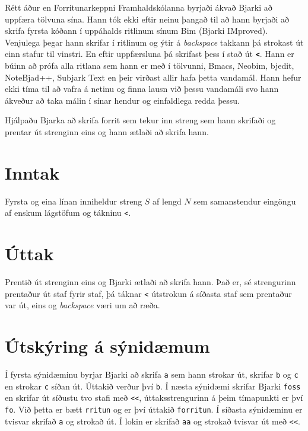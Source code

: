 

Rétt áður en Forritunarkeppni Framhaldskólanna byrjaði ákvað Bjarki að
uppfæra tölvuna sína. Hann tók ekki eftir neinu þangað til að hann byrjaði að
skrifa fyrsta kóðann í uppáhalds ritlinum sínum Bim (Bjarki IMproved). Venjulega
þegar hann skrifar í ritlinum og ýtir á \emph{backspace} takkann þá strokast út einn
stafur til vinstri. En eftir uppfærsluna þá skrifast þess í stað út \textbf{\texttt{<}}. Hann er
búinn að prófa alla ritlana sem hann er með í tölvunni, Bmacs, Neobim, bjedit,
NoteBjad++, Subjark Text en þeir virðast allir hafa þetta vandamál. Hann hefur
ekki tíma til að vafra á netinu og finna lausn við þessu vandamáli svo hann
ákveður að taka málin í sínar hendur og einfaldlega redda þessu.

Hjálpaðu Bjarka að skrifa forrit sem tekur inn streng sem hann skrifaði og
prentar út strenginn eins og hann ætlaði að skrifa hann.

\section*{Inntak}
Fyrsta og eina línan inniheldur streng $S$ af lengd $N$ sem samanstendur
eingöngu af enskum lágstöfum og tákninu \texttt{<}.

\section*{Úttak}
Prentið út strenginn eins og Bjarki ætlaði að skrifa hann. Það er, sé
strengurinn prentaður út staf fyrir staf, þá táknar \texttt{<} útstrokun á
síðasta staf sem prentaður var út, eins og \emph{backspace} væri um að ræða.

\section*{Útskýring á sýnidæmum}
Í fyrsta sýnidæminu byrjar Bjarki að skrifa \texttt{a} sem hann strokar út,
skrifar \texttt{b} og \texttt{c} en strokar \texttt{c} síðan út. Úttakið verður því
\texttt{b}.
Í næsta sýnidæmi skrifar Bjarki \texttt{foss} en skrifar út síðustu tvo stafi
með \texttt{<}\texttt{<}, úttaksstrengurinn á þeim tímapunkti er því \texttt{fo}. Við
þetta er bætt \texttt{rritun} og er því úttakið \texttt{forritun}.
Í síðasta sýnidæminu er tvisvar skrifað \texttt{a} og strokað út. Í lokin er
skrifað \texttt{aa} og strokað tvisvar út með \texttt{<}\texttt{<}.

